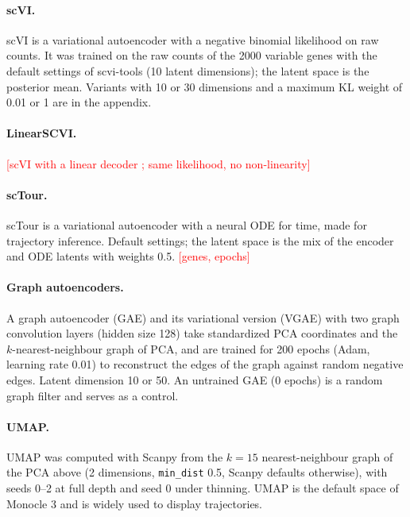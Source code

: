 \documentclass[10pt,a4paper,twocolumn]{article}
\newcommand{\todo}[1]{\textcolor{red}{[#1]}}
\begin{document}
\paragraph{scVI.}
scVI \cite{TODO-lopez2018} is a variational autoencoder with a negative binomial likelihood on
raw counts. It was trained on the raw counts of the 2000 variable genes with the default
settings of scvi-tools (10 latent dimensions); the latent space is the posterior mean. Variants
with 10 or 30 dimensions and a maximum KL weight of 0.01 or 1 are in the appendix.

\paragraph{LinearSCVI.}
\todo{scVI with a linear decoder \cite{TODO-svensson2020}; same likelihood, no non-linearity}

\paragraph{scTour.}
scTour \cite{TODO-li2023sctour} is a variational autoencoder with a neural ODE for time, made for
trajectory inference. Default settings; the latent space is the mix of the encoder and ODE
latents with weights 0.5. \todo{genes, epochs}

\paragraph{Graph autoencoders.}
A graph autoencoder (GAE) and its variational version (VGAE) \cite{TODO-kipf2016} with two graph
convolution layers (hidden size 128) take standardized PCA coordinates and the $k$-nearest-neighbour
graph of PCA, and are trained for 200 epochs (Adam, learning rate 0.01) to reconstruct the edges of
the graph against random negative edges. Latent dimension 10 or 50. An untrained GAE (0 epochs)
is a random graph filter and serves as a control.

\paragraph{UMAP.}
UMAP \cite{TODO-mcinnes2018} was computed with Scanpy from the $k=15$ nearest-neighbour graph of
the PCA above (2 dimensions, \texttt{min\_dist} 0.5, Scanpy defaults otherwise), with seeds 0--2
at full depth and seed 0 under thinning. UMAP is the default space of Monocle 3
\cite{TODO-cao2019monocle3} and is widely used to display trajectories.
\end{document}
